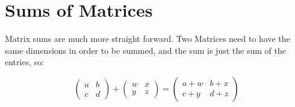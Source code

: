 \documentclass[10pt]{article}
\theoremstyle{definition}
\begin{document}
\section{Sums of Matrices}

Matrix sums are much more straight forward.  Two Matrices need to have the same dimensions in order to be summed, and the sum is just the sum of the entries, so:

$$\begin{pmatrix} a & b \\ c & d \end{pmatrix}+ \begin{pmatrix} w & x \\ y & z \end{pmatrix}=\begin{pmatrix} a+w & b+x \\ c+y & d+z \end{pmatrix}$$
\end{document}
